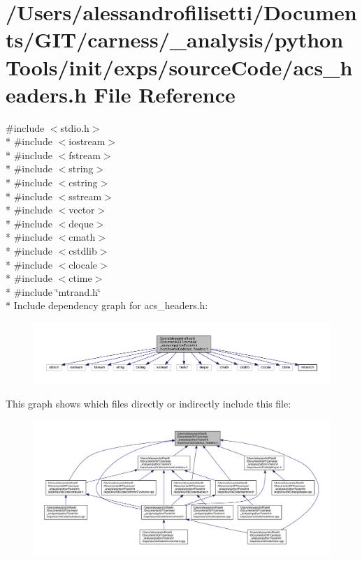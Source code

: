\hypertarget{a00050}{\section{/\+Users/alessandrofilisetti/\+Documents/\+G\+I\+T/carness/\+\_\+analysis/python\+Tools/init/exps/source\+Code/acs\+\_\+headers.h File Reference}
\label{a00050}
}
{\ttfamily \#include $<$stdio.\+h$>$}\\*
{\ttfamily \#include $<$iostream$>$}\\*
{\ttfamily \#include $<$fstream$>$}\\*
{\ttfamily \#include $<$string$>$}\\*
{\ttfamily \#include $<$cstring$>$}\\*
{\ttfamily \#include $<$sstream$>$}\\*
{\ttfamily \#include $<$vector$>$}\\*
{\ttfamily \#include $<$deque$>$}\\*
{\ttfamily \#include $<$cmath$>$}\\*
{\ttfamily \#include $<$cstdlib$>$}\\*
{\ttfamily \#include $<$clocale$>$}\\*
{\ttfamily \#include $<$ctime$>$}\\*
{\ttfamily \#include \char`\"{}mtrand.\+h\char`\"{}}\\*
Include dependency graph for acs\+\_\+headers.\+h\+:\nopagebreak
\begin{figure}[H]
\begin{center}
\leavevmode
\includegraphics[width=350pt]{a00162}
\end{center}
\end{figure}
This graph shows which files directly or indirectly include this file\+:\nopagebreak
\begin{figure}[H]
\begin{center}
\leavevmode
\includegraphics[width=350pt]{a00163}
\end{center}
\end{figure}
